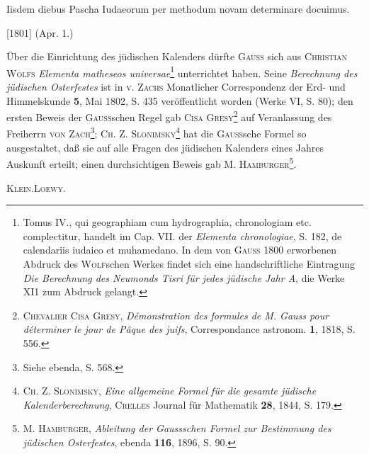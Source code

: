 \noindent\hspace*{\parindent}Iisdem diebus Pascha Iudaeorum per methodum novam determinare docuimus.
\par\noindent\hfill [1801] (Apr. 1.)
\par\medskip\begingroup\small
\renewcommand{\thefootnote}{**)}
\noindent\hspace*{\parindent}Über die Einrichtung des jüdischen Kalenders dürfte \textsc{Gauss} sich aus \textsc{Christian Wolfs} \textit{Elementa matheseos universae}\footnote{Tomus IV., qui geographiam cum hydrographia, chronologiam etc. complectitur, handelt im Cap. VII. der \textit{Elementa chronologiae}, S. 182, de calendariis iudaico et muhamedano. In dem von \textsc{Gauss} 1800 erworbenen Abdruck des \textsc{Wolf}schen Werkes findet sich eine handschriftliche Eintragung \textit{Die Berechnung des Neumonds Tisri für jedes jüdische Jahr A}, die Werke XI1 zum Abdruck gelangt.} unterrichtet haben. Seine \textit{Berechnung des jüdischen Osterfestes} ist in \textsc{v. Zachs} Monatlicher Correspondenz der Erd- und Himmelskunde \textbf{5}, Mai 1802, S. 435 veröffentlicht worden (Werke VI, S. 80); den ersten Beweis der \textsc{Gauss}schen Regel gab \textsc{Cisa Gresy}\renewcommand{\thefootnote}{***)}\footnote{\textsc{Chevalier Cisa Gresy}, \textit{Démonstration des formules de M. Gauss pour déterminer le jour de Pâque des juifs}, Correspondance astronom. \textbf{1}, 1818, S. 556.} auf Veranlassung des Freiherrn \textsc{von Zach}\renewcommand{\thefootnote}{\ensuremath{\dagger})}\footnote{Siehe ebenda, S. 568.}; \textsc{Ch. Z. Slonimsky}\renewcommand{\thefootnote}{\ensuremath{\dagger\dagger})}\footnote{\textsc{Ch. Z. Slonimsky}, \textit{Eine allgemeine Formel für die gesamte jüdische Kalenderberechnung}, \textsc{Crelles} Journal für Mathematik \textbf{28}, 1844, S. 179.} hat die \textsc{Gauss}sche Formel so ausgestaltet, daß sie auf alle Fragen des jüdischen Kalenders eines Jahres Auskunft erteilt; einen durchsichtigen Beweis gab \textsc{M. Hamburger}\renewcommand{\thefootnote}{\ensuremath{\dagger\dagger\dagger})}\footnote{\textsc{M. Hamburger}, \textit{Ableitung der Gaussschen Formel zur Bestimmung des jüdischen Osterfestes}, ebenda \textbf{116}, 1896, S. 90.}.
\par\noindent\hfill\textsc{Klein.\quad Loewy.}
\par\endgroup
